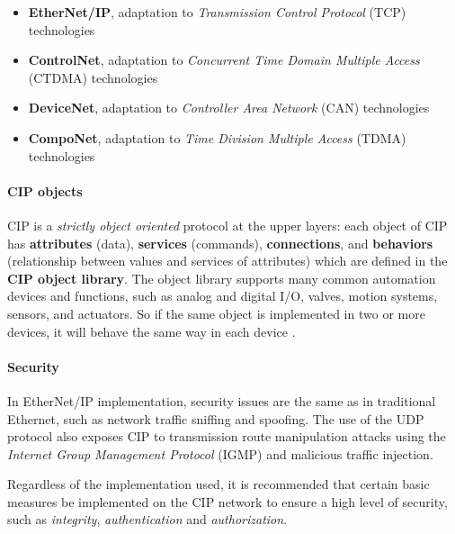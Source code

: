 \begin{itemize}
	\item \textbf{EtherNet/IP}, adaptation to \textit{Transmission Control Protocol} (TCP) technologies
	
	\item \textbf{ControlNet}, adaptation to \textit{Concurrent Time Domain Multiple Access} (CTDMA) technologies
	
	\item \textbf{DeviceNet}, adaptation to \textit{Controller Area Network} (CAN) technologies
	
	\item \textbf{CompoNet}, adaptation to \textit{Time Division Multiple Access} (TDMA) technologies
\end{itemize}

\paragraph{CIP objects} CIP is a \textit{strictly object oriented} protocol at the upper layers: each object of CIP has \textbf{attributes} (data), \textbf{services} (commands), \textbf{connections}, and \textbf{behaviors} (relationship between values and services of attributes) which are defined in the \textbf{CIP object library}. The object library supports many common automation devices and functions, such as analog and digital I/O, valves, motion systems, sensors, and actuators. So if the same object is implemented in two or more devices, it will behave the same way in each device \cite{cip_objects}.

\paragraph{Security}\cite{cip_security} In EtherNet/IP implementation, security issues are the same as in traditional Ethernet, such as network traffic sniffing and spoofing. The use of the UDP protocol also exposes CIP to transmission route manipulation attacks using the \textit{Internet Group Management Protocol} (IGMP) and malicious traffic injection.

\bigskip
Regardless of the implementation used, it is recommended that certain basic measures be implemented on the CIP network to ensure a high level of security, such as \textit{integrity}, \textit{authentication} and \textit{authorization}.

\vfill

